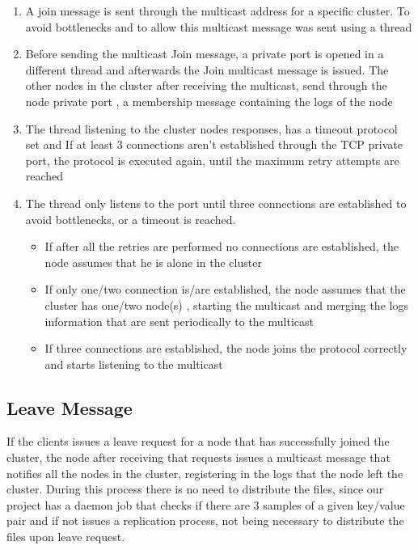 \begin{enumerate}
    \item A join message is sent through the multicast address for a specific cluster. To avoid bottlenecks and to allow this multicast message was sent using a thread
    \item Before sending the multicast Join message, a private port is opened in a different thread and afterwards the Join multicast message is issued. The other nodes in the cluster after receiving the multicast,  send through the node private port , a membership message containing the logs of the node
    \item The thread listening to the cluster nodes responses, has a timeout protocol set and If at least 3 connections aren't established through the TCP private port, the protocol is executed again, until the maximum retry attempts are reached
    \item The thread only listens to the port until three connections are established to avoid bottlenecks, or a timeout is reached.
    \begin{itemize}
        \item If after all the retries are performed no connections are established, the node assumes that he is alone in the cluster
        \item If only one/two connection is/are established, the node assumes that the cluster has one/two node(s) , starting the multicast and merging the logs information that are sent periodically to the multicast
        \item If three connections are established, the node joins the protocol correctly and starts listening to the multicast
    \end{itemize}
\end{enumerate}


\subsection{Leave Message}

If the clients issues a leave request for a node that has successfully joined the cluster, the node after receiving that requests issues a multicast message that notifies all the nodes in the cluster, registering in the logs that the node left the cluster. During this process there is no need to distribute the files, since our project has a daemon job that checks if there are 3 samples of a given key/value pair and if not issues a replication process, not being necessary to distribute the files upon leave request. 

